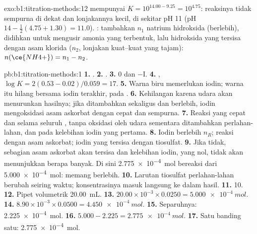 \begin{solution}{exo:b1:titration-methods:12}
 mempunyai $K = 10^{14.00 - 9.25} = 10^{4.75}$:
reaksinya tidak sempurna di dekat  dan lonjakannya kecil, di
sekitar pH 11 (pH  $14 - \frac12(4.75 + 1.30) = 11.0$). : tambahkan $n_1$ natrium hidroksida (berlebih), didihkan untuk
mengusir amonia yang terbentuk, lalu  hidroksida yang tersisa
dengan asam klorida ($n_2$, lonjakan kuat--kuat yang tajam):
$n(\ce{NH4+}) = n_1 - n_2$.
\end{solution}

\begin{solution}{pb:b1:titration-methods:1}
\textbf{1.} .
\textbf{2.} .
\textbf{3.} 0 dan $-$I.
\textbf{4.} , $\log K = 2(0.53 - 0.02)/0.059
= 17$.
\textbf{5.} Warna biru memerlukan iodin; warna itu hilang bersama iodin
terakhir, pada .
\textbf{6.} Kehilangan karena udara akan menurunkan hasilnya; jika
ditambahkan sekaligus dan berlebih, iodin mengoksidasi asam askorbat
dengan cepat dan sempurna.
\textbf{7.} Reaksi yang cepat dan  selama seluruh ,
tanpa oksidasi oleh udara sementara  ditambahkan perlahan-lahan,
dan  pada kelebihan iodin yang pertama.
\textbf{8.} Iodin berlebih $n_R$; reaksi dengan asam askorbat; 
iodin yang tersisa dengan tiosulfat.
\textbf{9.} Jika tidak, sebagian asam askorbat akan tersisa dan kelebihan
iodin, yang nol, tidak akan menunjukkan berapa banyak. Di sini
\qty{2.775e-4}{mol} bereaksi dari \qty{5.000e-4}{mol}: memang berlebih.
\textbf{10.} Larutan tiosulfat perlahan-lahan berubah seiring waktu;
konsentrasinya masuk langsung ke dalam hasil.
\textbf{11.} 10.
\textbf{12.} Pipet volumetrik \qty{20.00}{mL}.
\textbf{13.} $20.00 \times 10^{-3} \times 0.0250 = \qty{5.000e-4}{mol}$.
\textbf{14.} $8.90 \times 10^{-3} \times 0.0500 = \qty{4.450e-4}{mol}$.
\textbf{15.} Separuhnya: \qty{2.225e-4}{mol}.
\textbf{16.} $5.000 - 2.225 = \qty{2.775e-4}{mol}$.
\textbf{17.} Satu banding satu: \qty{2.775e-4}{mol}.

\end{solution}
